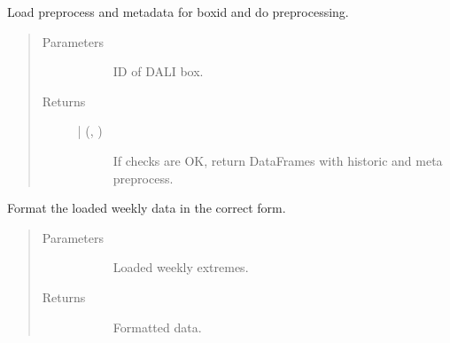 \documentclass[letterpaper,10pt,english]{sphinxmanual}
\begin{document}
\begin{fulllineitems}
\label{\detokenize{autoapi/src/preprocess/preprocess/index:src.preprocess.preprocess.load_data}}
Load preprocess and metadata for boxid and do preprocessing.
\begin{quote}\begin{description}
\item[{Parameters}] \leavevmode\begin{description}
\item[{}] \leavevmode
ID of DALI box.

\end{description}

\item[{Returns}] \leavevmode\begin{description}
\item[{ | (, )}] \leavevmode
If checks are OK, return DataFrames with historic and meta preprocess.

\end{description}

\end{description}\end{quote}

\end{fulllineitems}


\begin{fulllineitems}
\label{\detokenize{autoapi/src/preprocess/preprocess/index:src.preprocess.preprocess.format_data}}
Format the loaded weekly data in the correct form.
\begin{quote}\begin{description}
\item[{Parameters}] \leavevmode\begin{description}
\item[{}] \leavevmode
Loaded weekly extremes.

\end{description}

\item[{Returns}] \leavevmode\begin{description}
\item[{}] \leavevmode
Formatted data.

\end{description}

\end{description}\end{quote}

\end{fulllineitems}
\end{document}
